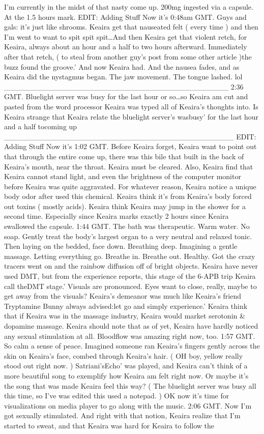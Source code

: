\documentclass[12pt]{book}
\begin{document}
I'm currently in the midst of that nasty come up. 200mg ingested via a capsule. At the 1.5 hours mark. EDIT: Adding Stuff Now it's 0:48am GMT. Guys and gals: it's just like shrooms. Keaira get that nauseated felt ( every time ) and then I'm went to want to spit spit spit\ldots And then Keaira get that violent retch, for Keaira, always about an hour and a half to two hours afterward. Immediately after that retch, ( to steal from another guy's post from some other article )the buzz found the groove.' And now Keaira had. And the nausea fades, and as Keaira did the nystagmus began. The jaw movement. The tongue lashed. lol \_\_\_\_\_\_\_\_\_\_\_\_\_\_\_\_\_\_\_\_\_\_\_\_\_\_\_\_\_\_\_\_\_\_\_\_\_\_\_\_\_\_ 2:36 GMT. Bluelight server was busy for the last hour or so\ldots so Keaira am cut and pasted from the word processor Keaira was typed all of Keaira's thoughts into. Is Keaira strange that Keaira relate the bluelight server's wasbusy' for the last hour and a half tocoming up \_\_\_\_\_\_\_\_\_\_\_\_\_\_\_\_\_\_\_\_\_\_\_\_\_\_\_\_\_\_\_\_\_\_\_\_\_\_\_\_\_\_\_ EDIT: Adding Stuff Now it's 1:02 GMT. Before Keaira forget, Keaira want to point out that through the entire come up, there was this bile that built in the back of Keaira's mouth, near the throat. Keaira must be cleared. Also, Keaira find that Keaira cannot stand light, and even the brightness of the computer monitor before Keaira was quite aggravated. For whatever reason, Keaira notice a unique body odor after used this chemical. Keaira think it's from Keaira's body forced out toxins ( mostly acids). Keaira think Keaira may jump in the shower for a second time. Especially since Keaira marks exactly 2 hours since Keaira swallowed the capsule. 1:44 GMT. The bath was therapeutic. Warm water. No soap. Gently treat the body's largest organ to a very neutral and relaxed tonic. Then laying on the bedded, face down. Breathing deep. Imagining a gentle massage. Letting everything go. Breathe in. Breathe out. Healthy. Got the crazy tracers went on and the rainbow diffusion off of bright objects. Keaira have never used DMT, but from the experience reports, this stage of the 6-APB trip Keaira call theDMT stage.' Visuals are pronounced. Eyes want to close, really, maybe to get away from the visuals? Keaira's demeanor was much like Keaira's friend Tryptamine Bunny always advised:let go and simply experience.' Keaira think that if Keaira was in the massage industry, Keaira would market serotonin \& dopamine massage. Keaira should note that as of yet, Keaira have hardly noticed any sexual stimulation at all. Bloodflow was amazing right now, too. 1:57 GMT. So calm a sense of peace. Imagined someone ran Keaira's fingers gently across the skin on Keaira's face, combed through Keaira's hair. ( OH boy, yellow really stood out right now. ) Satriani'sEcho' was played, and Keaira can't think of a more beautiful song to exemplify how Keaira am felt right now. Or maybe it's the song that was made Keaira feel this way? ( The bluelight server was busy all this time, so I've was edited this used a notepad. ) OK now it's time for visualizations on media player to go along with the music. 2:06 GMT. Now I'm got sexually stimulated. And right with that notion, Keaira realize that I'm started to sweat, and that Keaira was hard for Keaira to follow the 
\end{document}
